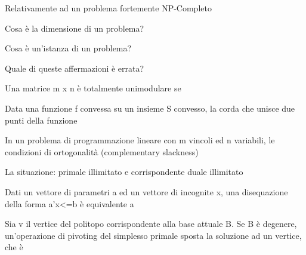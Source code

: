 \documentclass[answers, a4paper, 11pt]{exam}
\begin{document}
\begin{questions}
\begin{solution}
\end{solution}

\question Relativamente ad un problema fortemente NP-Completo
\begin{solution}

\end{solution}

\question Cosa è la dimensione di un problema?
\begin{solution}

\end{solution}

\question Cosa è un'istanza di un problema?
\begin{solution}

\end{solution}

\question Quale di queste affermazioni è errata?
\begin{solution}

\end{solution}

\question Una matrice m x n è totalmente unimodulare se
\begin{solution}

\end{solution}

\question Data una funzione f convessa su un insieme S convesso, la corda che unisce due punti della funzione
\begin{solution}

\end{solution}

\question In un problema di programmazione lineare con m vincoli ed n variabili, le condizioni di ortogonalità (complementary slackness)
\begin{solution}

\end{solution}

\question La situazione: primale illimitato e corrispondente duale illimitato
\begin{solution}

\end{solution}

\question Dati un vettore di parametri a ed un vettore di incognite x, una disequazione della forma a'x<=b è equivalente a
\begin{solution}

\end{solution}

\question Sia v il vertice del politopo corrispondente alla base attuale B. Se B è degenere, un'operazione di pivoting del simplesso primale sposta la soluzione ad un vertice, che è
\begin{solution}


\end{solution}
\end{questions}
\end{document}
